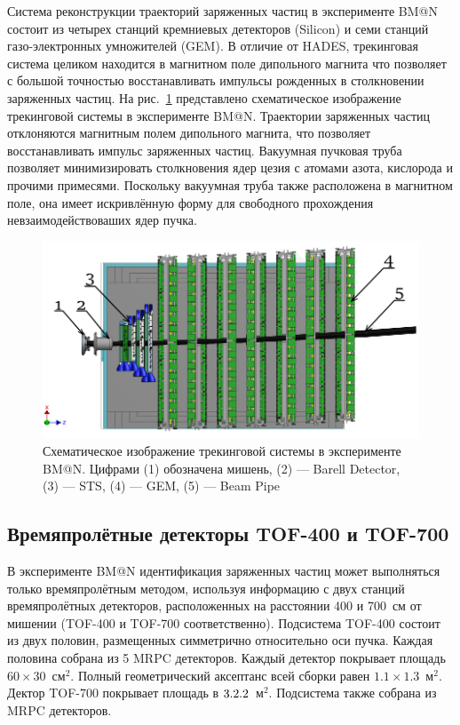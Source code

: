 Система реконструкции траекторий заряженных частиц в эксперименте BM@N состоит из четырех станций кремниевых детекторов (Silicon) и семи станций газо-электронных умножителей (GEM). 
В отличие от HADES, трекинговая система целиком находится в магнитном поле дипольного магнита что позволяет с большой точностью восстанавливать импульсы рожденных в столкновении заряженных частиц.
На рис.~\ref{fig:bmn_tracking} представлено схематическое изображение трекинговой системы в эксперименте BM@N.
Траектории заряженных частиц отклоняются магнитным полем дипольного магнита, что позволяет восстанавливать импульс заряженных частиц.
Вакуумная пучковая труба позволяет минимизировать столкновения ядер цезия с атомами азота, кислорода и прочими примесями.
Поскольку вакуумная труба также расположена в магнитном поле, она имеет искривлённую форму для свободного прохождения невзаимодействоваших ядер пучка.  
%
\begin{figure}[ht]
\begin{center}
    \includegraphics[width=0.75\linewidth]{images/bmn_tracking_system.png}
    \caption{Схематическое изображение трекинговой системы в эксперименте BM@N. Цифрами (1) обозначена мишень,
    (2) --- Barell Detector, (3) --- STS, (4) --- GEM, (5) --- Beam Pipe }
    \label{fig:bmn_tracking}
\end{center}
\end{figure}


\subsection{Времяпролётные детекторы TOF-400 и TOF-700}

В эксперименте BM@N идентификация заряженных частиц может выполняться только времяпролётным методом, используя информацию с двух станций времяпролётных детекторов, расположенных на расстоянии 400 и 700~см от мишении (TOF-400 и TOF-700 соответственно).
Подсистема TOF-400 состоит из двух половин, размещенных симметрично относительно оси пучка.
Каждая половина собрана из 5 MRPC детекторов.
Каждый детектор покрывает площадь $60\times30$~см$^2$.
Полный геометрический аксептанс всей сборки равен $1.1\times1.3$~м$^2$.
Дектор TOF-700 покрывает площадь в $3.2\time2.2$~м$^2$.
Подсистема также собрана из MRPC детекторов.

